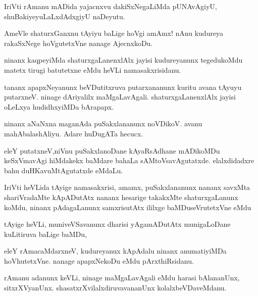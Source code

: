 \documentclass{article}
\begin{document}
\begin{mn}%
IriVti rAmanu mADida yajacnxvu dakiSxNegaLiMda pUNAvAgiyU, shuBakiyeyuLaLxdAdxgiyU naDeyutu.
\end{mn}

\begin{mn}%
AmeVle shaturxGanxnu tAyiyu baLige hoVgi amAmx! nAnu kudureya rakaSxNege hoVgutetxVne 
nanage AjecnxkoDu.
\end{mn}

\begin{mn}%
ninanx kaqpeyiMda shaturxgaLanenxlAlx jayisi kudureyanunx tegedukoMdu matetx tirugi 
batutetxne eMdu heVLi namasakxrisidanu.
\end{mn}

\begin{mn}%
tananx apapxNeyanunx beVDutitxruva putarxananunx kuritu avana tAyuyu putarxneV. ninage 
dAriyalilx maMgaLavAgali. shaturxgaLanenxlAlx jayisi oLeLxya hudidhxyiMDa bArapapx.
\end{mn}

\begin{mn}%
ninanx aNaNxna maganAda puSakxlananunx noVDikoV. avanu mahAbalashAliyu. Adare huDugATa 
hecucx.
\end{mn}

\begin{mn}%
eleY putatxneV,niVnu puSakxlanoDane kAyaRsAdhane mADikoMDu keSxVmavAgi hiMdakekx baMdare 
bahaLa sAMtoVsavAgutatxde. elalxdidadxre bahu duHKavuMtAgutatxde eMdaLu.
\end{mn}

\begin{mn}%
IriVti heVLida tAyige namasakxrisi, amamx, puSakxlananunx nananx savxMta shariVradaMte 
kApADutAtx nananx hesarige takakxMte shaturxgaLanunx  koMdu, ninanx pAdagaLanunx 
samxrisutAtx ililxge baMDuseVrutetxVne eMdu
\end{mn}

\begin{mn}%
tAyige heVLi, muniveVSavanunx dharisi yAgamADutAtx munigaLoDane kuLitiruva baLige baMDu, 
\end{mn}

\begin{mn}%
eleY rAmacaMdarxneV, kudureyanux kApAdalu ninanx anumatiyiMDa hoVhutetxVne. nanage 
apapxNekoDu eMdu pArxthiRsidanu.
\end{mn}

\begin{mn}%
rAmanu adanunx keVLi, ninage maMgaLavAgali eMdu harasi bAlananUnx, sitxrXVyanUnx. 
shasatxrXvilalxdiruvavananUnx kolalxbeVDaveMdanu.
\end{mn}
\end{document}

